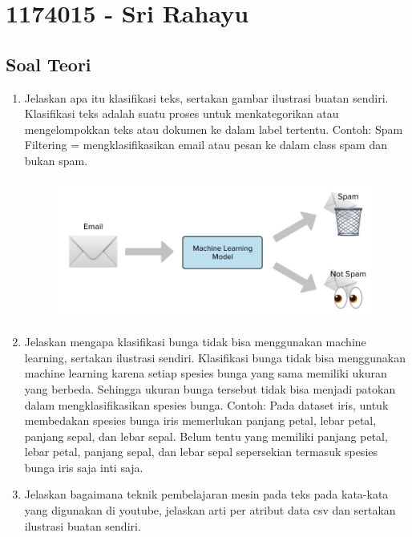 \section{1174015 - Sri Rahayu}
\subsection{Soal Teori}
\begin{enumerate}
	\item Jelaskan apa itu klasifikasi teks, sertakan gambar ilustrasi buatan sendiri.
	\hfill\break
	Klasifikasi teks adalah suatu proses untuk menkategorikan atau mengelompokkan teks atau dokumen ke dalam label tertentu.
	\hfill\break
	Contoh:
	\hfill\break
	Spam Filtering = mengklasifikasikan email atau pesan ke dalam class spam dan bukan spam.
	\hfill\break
	\begin{figure}[H]
	\centering
		\includegraphics[width=8 cm]{figures/1174015/chapter4/soalteori/1.PNG}
	\end{figure}

	\item Jelaskan mengapa klasifikasi bunga tidak bisa menggunakan machine learning, sertakan ilustrasi sendiri.
	\hfill\break
	Klasifikasi bunga tidak bisa menggunakan machine learning karena setiap spesies bunga yang sama memiliki ukuran yang berbeda. Sehingga ukuran bunga tersebut tidak bisa menjadi patokan dalam mengklasifikasikan spesies bunga.
	\hfill\break
	Contoh:
	\hfill\break
	Pada dataset iris, untuk membedakan spesies bunga iris memerlukan panjang petal, lebar petal, panjang sepal, dan lebar sepal. Belum tentu yang memiliki panjang petal, lebar petal, panjang sepal, dan lebar sepal sepersekian termasuk spesies bunga iris saja inti saja.

	\item Jelaskan bagaimana teknik pembelajaran mesin pada teks pada kata-kata yang digunakan di youtube, jelaskan arti per atribut data csv dan sertakan ilustrasi buatan sendiri.
	

\end{enumerate}
